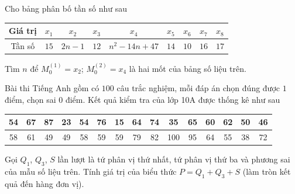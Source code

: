 \begin{ex}%
Cho bảng phân bố tần số như sau
\begin{longtable}{|c|c|c|c|c|c|c|c|c|}
\hline
Giá trị&$x_1$&$x_2$&$x_3$&$x_4$&$x_5$&$x_6$&$x_7$&$x_8$\\
\hline
Tần số&$15$&$2n-1$&$12$&$n^2-14n+47$&$14$&$10$&$16$&$17$\\
\hline
\end{longtable}
Tìm $n$ để $M_0^{(1)}=x_2$; $M_0^{(2)}=x_4$ là hai mốt của bảng số liệu trên.
\end{ex}

\begin{ex}%
Bài thi Tiếng Anh gồm có $100$ câu trắc nghiệm, mỗi đáp án chọn đúng được $1$ điểm, chọn sai $0$ điểm. Kết quả kiểm tra của lớp 10A được thống kê như sau 
\begin{longtable}{|c|c|c|c|c|c|c|c|c|c|c|c|c|c|c|}
\hline
54&67&87&23&54&76&15&64&74&35&65&60&62&50&46\\
\hline
58&61&49&49&58&59&59&79&82&100&95&64&55&38&72\\
\hline
\end{longtable}\noindent
Gọi $Q_1$, $Q_3$, $S$ lần lượt là tứ phân vị thứ nhất, tứ phân vị thứ ba và phương sai của mẫu số liệu trên. Tính giá trị của biểu thức $P=Q_1+Q_3+S$ (làm tròn kết quả đến hàng đơn vị).
\end{ex}

